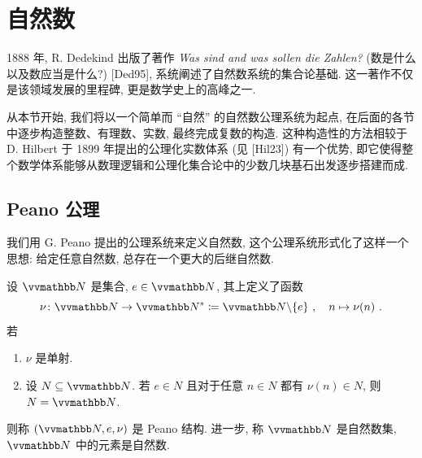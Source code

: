 \newpage

\section{自然数}

1888 年, R. Dedekind 出版了著作 \textsl{Was sind and was sollen die Zahlen?} (数是什么以及数应当是什么?) [Ded95], 系统阐述了自然数系统的集合论基础. 这一著作不仅是该领域发展的里程碑, 更是数学史上的高峰之一.

从本节开始, 我们将以一个简单而 ``自然'' 的自然数公理系统为起点, 在后面的各节中逐步构造整数、有理数、实数, 最终完成复数的构造. 这种构造性的方法相较于 D. Hilbert 于 1899 年提出的公理化实数体系 (见 [Hil23]) 有一个优势, 即它使得整个数学体系能够从数理逻辑和公理化集合论中的少数几块基石出发逐步搭建而成.

\subsection{Peano 公理}

我们用 G. Peano 提出的公理系统来定义自然数, 这个公理系统形式化了这样一个思想: 给定任意自然数, 总存在一个更大的后继自然数.

\begin{axiom}[自然数]\label{ax:natural-numbers}
    设 \(\N\) 是集合, \(e \in \N\), 其上定义了函数
    \[
        \nu \colon \N \to \N^\ast \coloneqq \N \backslash \{e\}\ ,\quad n \mapsto \nu(n)\ .
    \]
    若
    \begin{enumerate}[label={\((\mathrm N_{\arabic*})\)}]
        \item \(\nu\) 是单射.
        \item 设 \(N \subseteq \N\). 若 \(e \in N\) 且对于任意 \(n \in N\) 都有 \(\nu(n) \in N\), 则 \(N = \N\).
    \end{enumerate}
    则称 \((\N, e, \nu)\) 是 Peano 结构. 进一步, 称 \(\N\) 是自然数集, \(\N\) 中的元素是自然数.
\end{axiom}

